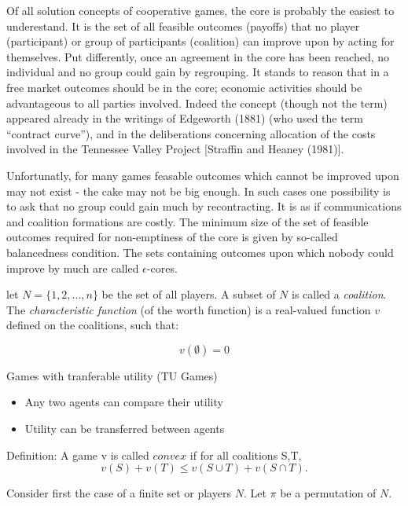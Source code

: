 \documentclass{article}
\begin{document}
Of all solution concepts of cooperative games, the core is probably the easiest to underestand. It is the set of all feasible outcomes (payoffs) that no player (participant) or group of participants (coalition) can improve upon by acting for themselves. Put differently, once an agreement in the core has been reached, no individual and no group could gain by regrouping. It stands to reason that in a free market outcomes should be in the core; economic activities should be advantageous to all parties involved. Indeed the concept (though not the term) appeared already in the writings of Edgeworth (1881) (who used the term ``contract curve''), and in the deliberations concerning allocation of the costs involved in the Tennessee Valley Project [Straffin and Heaney (1981)].

Unfortunatly, for many games feasable outcomes which cannot be improved upon may not exist - the cake may not be big enough. In such cases one possibility is to ask that no group could gain much by recontracting. It is as if communications and coalition formations are costly. The minimum size of the set of feasible outcomes required for non-emptiness of the core is given by so-called balancedness condition. The sets containing outcomes upon which nobody could improve by much are called $\epsilon$-cores. 

let $N = \{1,2,...,n\}$ be the set of all players. A subset of $N$ is called a \emph{coalition}. The \textit{characteristic function} (of the worth function) is a real-valued function $v$ defined on the coalitions, such that:

\begin{equation}\label{eq:v0}
v(\emptyset) = 0
\end{equation}


Games with tranferable utility (TU Games)
\begin{itemize}
	\item Any two agents can compare their utility
	\item Utility can be transferred between agents
\end{itemize}

Definition: A game v is called $convex$ if for all coalitions S,T,
\begin{equation}\label{eq:con1}
v(S) + v(T) \leq v(S \cup T) + v(S \cap T).
\end{equation}

Consider first the case of a finite set or players $N$. Let $\pi$ be a permutation of $N$.
\end{document}
